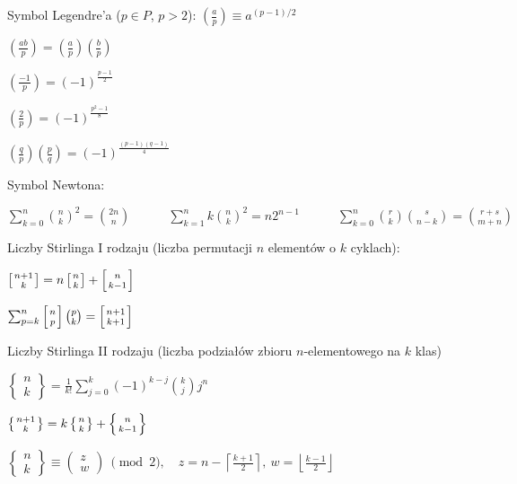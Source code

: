 \documentclass[10pt]{article}
\begin{document}
 
Symbol Legendre'a ($p\in P$, $p>2$): $\left(\frac a p \right)\equiv a^{(p-1)/2}$

\begin{multicols}{2}

$\left(\frac {ab} p \right) = \left(\frac a p \right)\left(\frac b p \right)$
 
$\left(\frac {-1} p \right) = (-1)^{\frac{p-1}2}$

\columnbreak

$\left(\frac 2 p \right) = (-1)^{\frac{p^2-1}8}$
 
$\left(\frac q p \right)\left(\frac p q \right) = (-1)^{\frac{(p-1)(q-1)}4}$

\end{multicols}
 
Symbol Newtona:
 
$\sum_{k=0}^n {n \choose k} ^2 = {{2n} \choose n} \quad\quad\quad \sum_{k=1}^n k{n \choose k} ^2 = n2^{n-1} \quad\quad\quad \sum_{k=0}^n {r \choose k}{s \choose n-k} = {r+s \choose m+n}$

Liczby Stirlinga I rodzaju (liczba permutacji $n$ elementów o $k$ cyklach):

\begin{multicols}{2}

$\left[{n+1\atop k}\right] = n \left[{n\atop k}\right] + \left[{n\atop k-1}\right]$

\columnbreak

$\sum_{p=k}^{n} {\left[{n\atop p}\right]\binom{p}{k}} = \left[{n+1\atop k+1}\right]$

\end{multicols}

Liczby Stirlinga II rodzaju (liczba podziałów zbioru $n$-elementowego na $k$ klas)

\begin{multicols}{2}

    $\left\{\begin{matrix} n \\ k \end{matrix}\right\} = \frac{1}{k!}\sum_{j=0}^k (-1)^{k-j}{k \choose j} j^n$

\columnbreak

$\left\{{n+1\atop k}\right\} = k \left\{{ n \atop k }\right\} + \left\{{n\atop k-1}\right\}$

\end{multicols}

$\left\{\begin{matrix}n\\k\end{matrix}\right\}\equiv\begin{pmatrix}z\\w\end{pmatrix}\ \pmod{2},\quad
z = n - \left\lceil\displaystyle\frac{k + 1}{2}\right\rceil,\ w = \left\lfloor\displaystyle\frac{k - 1}{2}\right\rfloor$
\end{document}
